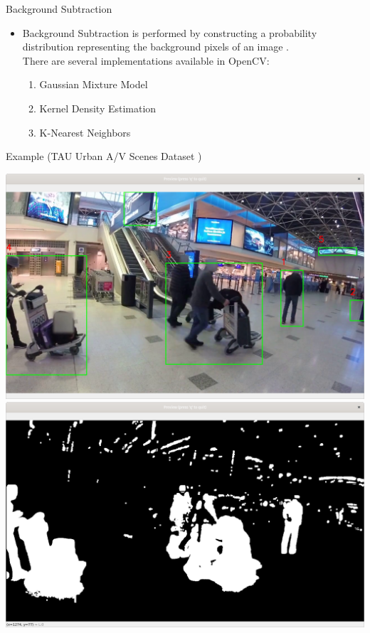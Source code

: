 \documentclass[10pt]{beamer}
\begin{document}
\begin{frame}{Background Subtraction}

\begin{itemize}

\item Background Subtraction is performed by constructing a probability distribution representing the background pixels of an image \cite{zivkovic_efficient_2006}.\\[2mm]

There are several implementations available in OpenCV:

\begin{enumerate}
\item Gaussian Mixture Model
\item Kernel Density Estimation
\item K-Nearest Neighbors\\[4mm]
\end{enumerate}

\end{itemize}

\begin{exampleblock}{Example (TAU Urban A/V Scenes Dataset \cite{wang_curated_2021})}
\begin{center}
\includegraphics[scale=0.1]{figures/helsinki_bgsub}\includegraphics[scale=0.1]{figures/helsinki_bgsub_filtered}
\end{center}
\end{exampleblock}

\end{frame}
\end{document}

